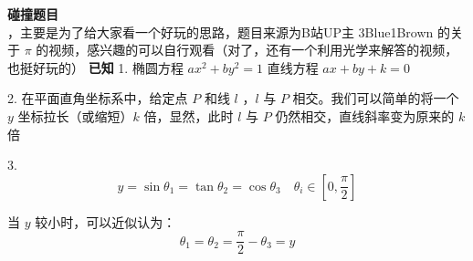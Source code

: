 \documentclass{article}
\begin{document}
\textbf{碰撞题目}\\
，主要是为了给大家看一个好玩的思路，题目来源为B站UP主 3Blue1Brown 的关于 $\pi$ 的视频，感兴趣的可以自行观看（对了，还有一个利用光学来解答的视频，也挺好玩的）
\textbf{已知}
1. 椭圆方程 $ax^2+by^2=1$ 直线方程 $ax+by+k=0$ 

2. 在平面直角坐标系中，给定点 $P$ 和线 $l$ ，$l$ 与 $P$ 相交。我们可以简单的将一个 $y$ 坐标拉长（或缩短）$k$ 倍，显然，此时 $l$ 与 $P$ 仍然相交，直线斜率变为原来的 $k$ 倍

3. $$
   y = \sin \theta_1 = \tan \theta_2 = \cos \theta_3\quad \theta_i\in[0,\frac{\pi}{2}]
   $$

   当 $y$ 较小时，可以近似认为：
   $$
   \theta_1=\theta_2=\frac{\pi}{2}-\theta_3=y
   $$
\end{document}
